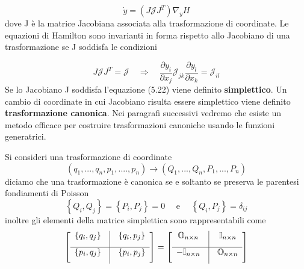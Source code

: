 \begin{equation*}
	\dot{y} = (J \mathcal{J} J^T) \nabla_yH
\end{equation*}
dove J \`{e} la matrice Jacobiana associata alla trasformazione di coordinate. Le equazioni di Hamilton sono invarianti in forma rispetto allo Jacobiano di una trasformazione se J soddisfa le condizioni

\begin{equation}
	J\mathcal{J}J^T = \mathcal{J} \quad \Rightarrow \quad \frac{\partial y_i}{\partial x_j} \mathcal{J}_{j k} \frac{\partial y_l}{\partial x_k}=\mathcal{J}_{i l}
\end{equation}
\newline
Se lo Jacobiano J soddisfa l'equazione (5.22) viene definito \textbf{simplettico}.
 Un cambio di coordinate in cui Jacobiano risulta essere simplettico viene definito \textbf{trasformazione canonica}.
 \newline 
 Nei paragrafi successivi vedremo che esiste un metodo efficace per costruire trasformazioni canoniche usando le funzioni generatrici.
\newline
\begin{theorem}
Si consideri una trasformazione di coordinate 
\begin{equation}
	(q_1,...,q_n,p_1,....,p_n) \rightarrow (Q_1,...,Q_n,P_1,...,P_n)
\end{equation}
diciamo che una trasformazione \`{e} canonica se e soltanto se preserva le parentesi fondiamenti di Poisson
\begin{equation}
	\left\{Q_i, Q_j\right\}=\left\{P_i, P_j\right\}=0 \quad \text { e } \quad\left\{Q_i, P_j\right\}=\delta_{i j}
\end{equation}
inoltre gli elementi della matrice simplettica sono rappresentabili come
\begin{equation}
	\left [ \begin{array}{ccc}
		\{q_i,q_j\} & \vline & \{q_i,p_j\}\\[0.1in]
		\hline 
		\{p_i,q_j\} & \vline & \{p_i,p_j\}\\[0.1in]
	\end{array} \right ]
	= \left [ \begin{array}{ccc}
		\mathbb{O}_{n \times n} & \vline & \mathbb{I}_{n \times n}\\[0.1in]
		\hline 
		-\mathbb{I}_{n \times n} & \vline & \mathbb{O}_{n \times n}\\[0.1in]
	\end{array} \right ]
\end{equation}
\end{theorem}

